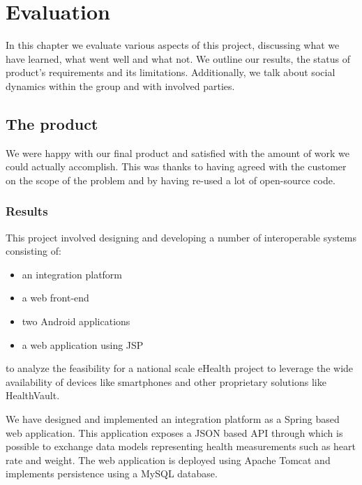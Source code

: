 \chapter{Evaluation} 
\label{ch:evaluation}


In this chapter we evaluate various aspects of this project, discussing what we
have learned, what went well and what not.
We outline our results, the status of product's requirements and its limitations.
Additionally, we talk about social dynamics within the group and with involved parties.

\section{The product}

We were happy with our final product and satisfied with the amount of work we could actually accomplish.
This was thanks to having agreed with the customer on the scope of the problem and by having re-used a
lot of open-source code.

\subsection{Results}

This project involved designing and developing a number of interoperable systems consisting of:
\begin{itemize}
\item an integration platform
\item a web front-end %
\item two Android applications
\item a web application using JSP
\end{itemize}
to analyze the feasibility for a national scale eHealth project to leverage the wide availability of devices
like smartphones and other proprietary solutions like HealthVault.

We have designed and implemented an integration platform as a Spring based web application.
This application exposes a JSON based API through which is possible to exchange data models representing health
measurements such as heart rate and weight.
The web application is deployed using Apache Tomcat and implements persistence using a MySQL database.

